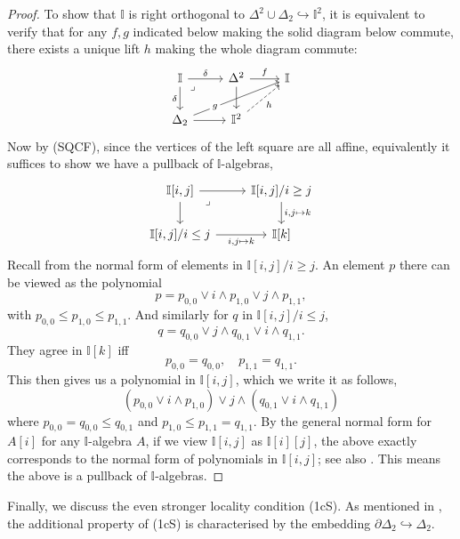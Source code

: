 \documentclass[a4paper,12pt]{amsart}
\theoremstyle{definition}
\newcommand{\mbb}[1]{\mathbb{#1}}
\newcommand{\I}{\mbb I}
\newcommand{\hook}{\hookrightarrow}
\begin{document}
\begin{proof}
  To show that $\I$ is right orthogonal to $\Delta^2 \cup \Delta_2 \hook \I^2$, it is equivalent to verify that for any $f,g$ indicated below making the solid diagram below commute, there exists a unique lift $h$ making the whole diagram commute:
  \[\begin{tikzcd}
    \I \ar[r, "\delta"] \ar[d, "\delta"'] & \Delta^2 \ar[r, "f"] \ar[d] & \I \\
    \Delta_2 \ar[urr, "g"{description, near start}] \ar[r] & \I^2 \ar[ur, dashed, "h"']
    \arrow["\lrcorner"{anchor=center, pos=0.125}, draw=none, from=1-1, to=2-2]
  \end{tikzcd}\]
  Now by (SQCF), since the vertices of the left square are all affine, equivalently it suffices to show we have a pullback of $\I$-algebras,
  \[\begin{tikzcd}
    {\I[i,j]} \ar[r] \ar[d] & {\I[i,j]/i \ge j} \ar[d, "{i,j \mapsto k}"] \\
    {\I[i,j]/i \le j} \ar[r, "{i,j\mapsto k}"'] & {\I[k]}
    \arrow["\lrcorner"{anchor=center, pos=0.125}, draw=none, from=1-1, to=2-2]
  \end{tikzcd}\]
  Recall from  the normal form of elements in $\I[i,j]/i\ge j$. An element $p$ there can be viewed as the polynomial 
  \[ p = p_{0,0} \vee i \wedge p_{1,0} \vee j \wedge p_{1,1}, \]
  with $p_{0,0} \le p_{1,0} \le p_{1,1}$. And similarly for $q$ in $\I[i,j]/i \le j$, 
  \[ q = q_{0,0} \vee j \wedge q_{0,1} \vee i \wedge q_{1,1}. \]
  They agree in $\I[k]$ iff 
  \[ p_{0,0} = q_{0,0}, \quad p_{1,1} = q_{1,1}. \]
  This then gives us a polynomial in $\I[i,j]$, which we write it as follows,
  \[ (p_{0,0} \vee i \wedge p_{1,0}) \vee j \wedge (q_{0,1} \vee i \wedge q_{1,1}) \]
  where $p_{0,0} = q_{0,0} \le q_{0,1}$ and $p_{1,0} \le p_{1,1} = q_{1,1}$. 
  By the general normal form for $A[i]$ for any $\I$-algebra $A$, if we view $\I[i,j]$ as $\I[i][j]$, the above exactly corresponds to the normal form of polynomials in $\I[i,j]$; see also \citet[Thm.\ 10.21]{lausch2000algebra}. This means the above is a pullback of $\I$-algebras.
\end{proof}



Finally, we discuss the even stronger locality condition (1cS). As mentioned in , the additional property of (1cS) is characterised by the embedding $\partial\Delta_2 \hook \Delta_2$.
\end{document}
